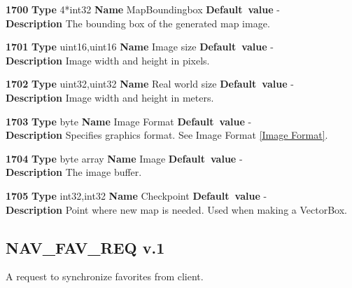 \documentclass[a4paper]{article}
\begin{document}
\begin{list}{\textbf{ParamID}}{}
\item \textbf{1700} \textbf{Type} 4*int32 \textbf{Name} MapBoundingbox
                 \textbf{Default~value} - \\
  \textbf{Description} The bounding box of the generated map image.
\item \textbf{1701} \textbf{Type} uint16,uint16 \textbf{Name} Image size
                 \textbf{Default~value} - \\
  \textbf{Description} Image width and height in pixels.
\item \textbf{1702} \textbf{Type} uint32,uint32 \textbf{Name} Real world size
                 \textbf{Default~value} - \\
  \label{Real world size}
  \textbf{Description} Image width and height in meters.
\item \textbf{1703} \textbf{Type} byte \textbf{Name} Image Format
                 \textbf{Default~value} - \\
  \textbf{Description} Specifies graphics format. See Image Format 
  \ref{Image Format}.
\item \textbf{1704} \textbf{Type} byte array \textbf{Name} Image
                 \textbf{Default~value} - \\
  \label{Image}
  \textbf{Description} The image buffer.
\item \textbf{1705} \textbf{Type} int32,int32 \textbf{Name} Checkpoint
                 \textbf{Default~value} - \\
  \label{Checkpoint}
  \textbf{Description} Point where new map is needed. Used when making a
  VectorBox.
\end{list}


\subsection{NAV\_FAV\_REQ v.1}

A request to synchronize favorites from client.
\end{document}
